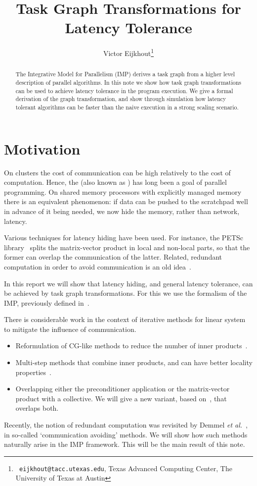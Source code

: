 \documentclass[11pt,fleqn]{article}
\title{Task Graph Transformations for Latency Tolerance}
\author{Victor Eijkhout\thanks{{\tt
      eijkhout@tacc.utexas.edu}, Texas Advanced Computing Center, The
    University of Texas at Austin}}
\begin{document}
\maketitle

\begin{abstract}
The Integrative Model for Parallelism (IMP) derives a task graph from
a higher level description of parallel algorithms.
In this note we show how task graph transformations can be used to
achieve latency tolerance in the program execution. We give a formal
derivation of the graph transformation, and show through simulation
how latency tolerant algorithms can be faster than the naive execution
in a strong scaling scenario.
\end{abstract}

\section{Motivation}

On clusters the cost of communication can be high relatively to
the cost of computation. Hence, the  (also known as ) has
long been a goal of parallel programming.
%
On shared memory processors
with explicitly managed  memory there is an
equivalent phenomenon: if data can be pushed to the scratchpad well in
advance of it being needed, we now hide the memory, rather than
network, latency.

Various techniques for latency hiding have been used. For instance,
the PETSc library~\cite{GrSm:petsc} splits the matrix-vector product
in local and non-local parts, so that the former can overlap the
communication of the latter.
%
Related, redundant computation in order to avoid communication is an
old idea~\cite{OpJo:improved-ssor}.

In this report we will show that latency hiding, and general latency
tolerance, can be achieved by task graph transformations. For this we
use the formalism of the \ac{IMP}, previously defined
in~\cite{Eijkhout:mathematical2016arxiv}.

There is considerable work in the context of iterative methods for
linear system to mitigate the influence of communication.
\begin{itemize}
\item Reformulation of CG-like methods to reduce the number of inner
  products~\cite{ChGe:sstep,DAzEijRo:ppscicomp,Sa:practicalKrylov,Me:multicg}.
\item Multi-step methods that combine inner products, and can have
  better locality properties~\cite{ChGe:sstep}.
\item
  Overlapping either the preconditioner
  application or the matrix-vector product with a
  collective\cite{dehevo92:acta}. We will give a new variant, based
  on~\cite{Gropp:libraries}, that overlaps both.
\end{itemize}
Recently, the notion of redundant computation was revisited by Demmel
\emph{et al.}~\cite{Demmel2008IEEE:avoiding}, in so-called
`communication avoiding' methods. We will show how such methods
naturally arise in the IMP framework. This will be the main result of
this note.
\end{document}

